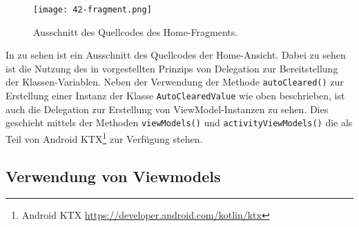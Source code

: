 \begin{figure}[H]
    \texttt{[image: 42-fragment.png]}
    \caption{Ausschnitt des Quellcodes des Home-Fragments.}\label{fig:fragment}
\end{figure}

\newpage

In  zu sehen ist ein Ausschnitt des Quellcodes der Home-Ansicht. Dabei zu sehen ist die Nutzung des in  vorgestellten Prinzips von Delegation zur Bereitstellung der Klassen-Variablen. Neben der Verwendung der Methode \texttt{autoCleared()} zur Erstellung einer Instanz der Klasse \texttt{AutoClearedValue} wie oben beschrieben, ist auch die Delegation zur Erstellung von ViewModel-Instanzen zu sehen. Dies geschieht mittels der Methoden \texttt{viewModels()} und \texttt{activityViewModels()} die als Teil von Android KTX\footnote{Android KTX \url{https://developer.android.com/kotlin/ktx}} zur Verfügung stehen.

\subsection{Verwendung von Viewmodels}\label{subsec:viewmodel-implementation}

